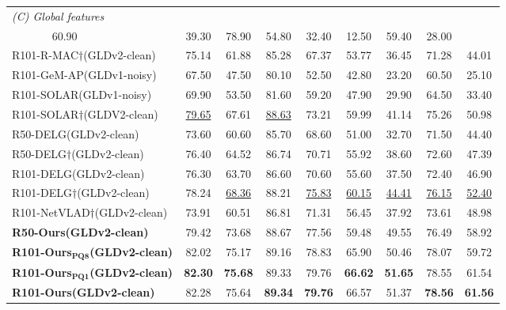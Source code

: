 \documentclass[letterpaper]{article} \usepackage{aaai22}  \usepackage{times}  \usepackage{helvet}  \usepackage{courier}  \usepackage[hyphens]{url}  \usepackage{graphicx} \urlstyle{rm} \def\UrlFont{\rm}  \usepackage{natbib}  \usepackage{caption} \DeclareCaptionStyle{ruled}{labelfont=normalfont,labelsep=colon,strut=off} \frenchspacing  \setlength{\pdfpagewidth}{8.5in}  \setlength{\pdfpageheight}{11in}  \usepackage{algorithm}
\begin{document}
\begin{table*}[h]
\begin{center}
{\begin{tabular}{llcccccccc}
				\multicolumn{10}{l}{\textsl{(C) Global features} } \\ \hdashline
				\multicolumn{2}{l}{R101-R-MAC(NC-clean)}&60.90  &39.30 & 78.90&54.80 &32.40 &12.50 &59.40 &28.00 \\ 
				\multicolumn{2}{l}{R101-R-MAC$\dagger$(GLDv2-clean)}&75.14  &61.88 & 85.28&67.37 &53.77 &36.45 &71.28 &44.01 \\
				\multicolumn{2}{l}{R101-GeM-AP(GLDv1-noisy)}& 67.50  &47.50 &80.10 &52.50 &42.80 &23.20 &60.50 &25.10 \\ 
				\multicolumn{2}{l}{R101-SOLAR(GLDv1-noisy)}&69.90  & 53.50 &81.60 &59.20 & 47.90 &29.90 & 64.50 & 33.40 \\ 
				\multicolumn{2}{l}{R101-SOLAR$\dagger$(GLDV2-clean)}&\underline{79.65}  & 67.61 & \underline{88.63} &73.21 & 59.99 &41.14 & 75.26 & 50.98 \\ 
				\multicolumn{2}{l}{R50-DELG(GLDv2-clean)}&73.60  &60.60 &85.70 &68.60 &51.00 &32.70 &71.50 &44.40 \\ 
				\multicolumn{2}{l}{R50-DELG$\dagger$(GLDv2-clean)}&76.40  &64.52 &86.74 &70.71 &55.92 &38.60  &72.60 &47.39  \\
				\multicolumn{2}{l}{R101-DELG(GLDv2-clean)}&76.30  &63.70 &86.60 &70.60 &55.60 &37.50 &72.40 &46.90 \\ 
				\multicolumn{2}{l}{R101-DELG$\dagger$(GLDv2-clean)}&78.24  &\underline{68.36} &88.21 &\underline{75.83} &\underline{60.15} &\underline{44.41} &\underline{76.15} &\underline{52.40} \\ 
				\multicolumn{2}{l}{R101-NetVLAD$\dagger$(GLDv2-clean)}&73.91  &60.51 &86.81 &71.31 &56.45 &37.92 &73.61 &48.98 \\ 
				\toprule
				\multicolumn{2}{l}{\textbf{R50-Ours(GLDv2-clean)}} & 79.42 & 73.68 & 88.67 & 77.56 & 59.48 & 49.55 & 76.49 & 58.92\\
				\multicolumn{2}{l}{\textbf{R101-Ours$_{\mathbf{PQ8}}$(GLDv2-clean)}} & 82.02 & 75.17 & 89.16 & 78.83 & 65.90 & 50.46 & 78.07 & 59.72 \\
				\multicolumn{2}{l}{\textbf{R101-Ours$_{\mathbf{PQ1}}$(GLDv2-clean)}} & \textbf{82.30} & \textbf{75.68} & 89.33 & 79.76 & \textbf{66.62} & \textbf{51.65} & 78.55 & 61.54 \\
				\multicolumn{2}{l}{\textbf{R101-Ours(GLDv2-clean)}} &  82.28 & 75.64 & \textbf{89.34} & \textbf{79.76} & 66.57 & 51.37 & \textbf{78.56} & \textbf{61.56}\\
				\toprule
			\end{tabular}
		}	
	\end{center}

\end{table*}
\end{document}

